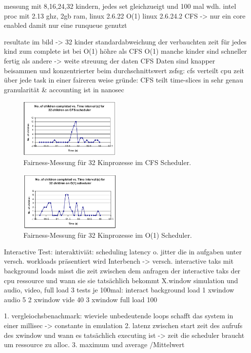 messung mit 8,16,24,32 kindern, jedes set gleichzueigt und 100 mal wdh.
intel proc mit 2.13 ghz, 2gb ram, linux 2.6.22 O(1) linux 2.6.24.2 CFS -> nur ein core enabled damit nur eine runqueue genutzt

resultate im bild -> 32 kinder
standardabweichung der verbauchten zeit für jedes kind zum complete ist bei O(1) höhre als CFS
O(1) manche	kinder sind schneller fertig als andere -> weite streuung der daten
CFS Daten sind knapper beisammen und konzentrierter beim durchschnittswert
zsfsg: cfs verteilt cpu zeit über jede task in einer faireren weise
gründe: CFS teilt time-slices in sehr genau granularität \& accounting ist in nanosec
\begin{figure}[h]
	\centering
	\includegraphics[width=0.45\textwidth]{pictures/fairness_32_cfs.png}
	\caption{Fairness-Messung für 32 Kinprozesse im CFS Scheduler.}
	\label{fig:fair_meas_cfs}
\end{figure}
\begin{figure}[h]
 	\centering
 	\includegraphics[width=0.45\textwidth]{pictures/fairness_32_O1.png}
 	\caption{Fairness-Messung für 32 Kinprozesse im O(1) Scheduler.}
 	\label{fig:fair_meas_o1}
\end{figure}

Interactive Test:
interaktiviät: scheduling latency o. jitter die in aufgaben unter versch. workloads präsentiert wird
Interbench -> versch. interactive taks mit background loads
misst die zeit zwischen dem anfragen der interactive taks der cpu ressource und wann sie sie tatsächlich bekommt
X.window simulation und audio, video, full load
3 tests je 100mal:	
  interact	background load
1 xwindow	audio 5 %
2 xwindow	vide 40 %
3 xwindow	full load 100 %
 
1. vergleiochsbenachmark: wieviele unbedeutende loops schafft das system in einer millisec -> constante in emulation
2. latenz zwischen start zeit des aufrufs des xwindow und wann es tatsächlich executing ist
	-> zeit die scheduler braucht um ressource zu alloc.
3. maximum und average /Mittelwert

